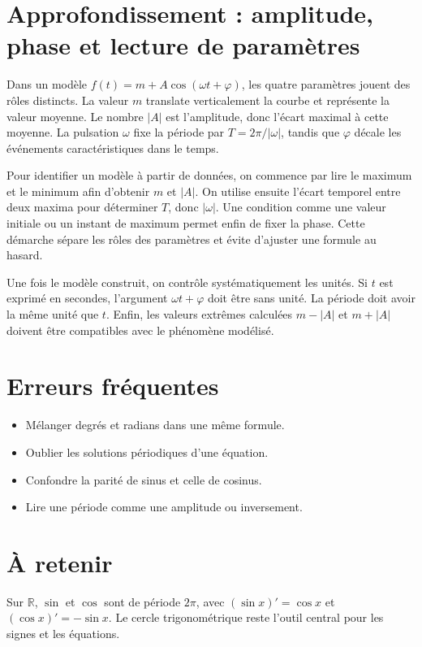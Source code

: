 \section{Approfondissement : amplitude, phase et lecture de paramètres}
Dans un modèle $f(t)=m+A\cos(\omega t+\varphi)$, les quatre paramètres jouent des rôles distincts. La valeur $m$ translate verticalement la courbe et représente la valeur moyenne. Le nombre $|A|$ est l’amplitude, donc l’écart maximal à cette moyenne. La pulsation $\omega$ fixe la période par $T=2\pi/|\omega|$, tandis que $\varphi$ décale les événements caractéristiques dans le temps.

Pour identifier un modèle à partir de données, on commence par lire le maximum et le minimum afin d’obtenir $m$ et $|A|$. On utilise ensuite l’écart temporel entre deux maxima pour déterminer $T$, donc $|\omega|$. Une condition comme une valeur initiale ou un instant de maximum permet enfin de fixer la phase. Cette démarche sépare les rôles des paramètres et évite d’ajuster une formule au hasard.

Une fois le modèle construit, on contrôle systématiquement les unités. Si $t$ est exprimé en secondes, l’argument $\omega t+\varphi$ doit être sans unité. La période doit avoir la même unité que $t$. Enfin, les valeurs extrêmes calculées $m-|A|$ et $m+|A|$ doivent être compatibles avec le phénomène modélisé.

\section{Erreurs fréquentes}
\begin{itemize}
\item Mélanger degrés et radians dans une même formule.
\item Oublier les solutions périodiques d’une équation.
\item Confondre la parité de sinus et celle de cosinus.
\item Lire une période comme une amplitude ou inversement.
\end{itemize}

\section{À retenir}
\begin{aretenir}
Sur $\mathbb{R}$, $\sin$ et $\cos$ sont de période $2\pi$, avec $(\sin x)'=\cos x$ et $(\cos x)'=-\sin x$. Le cercle trigonométrique reste l’outil central pour les signes et les équations.
\end{aretenir}
